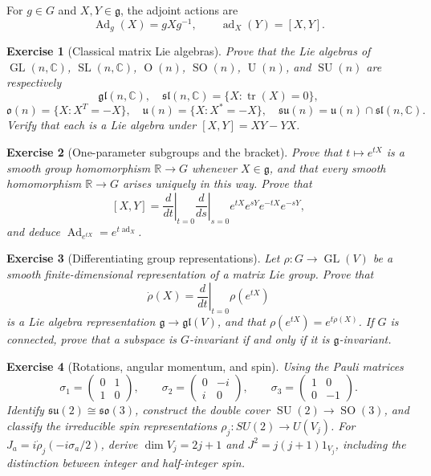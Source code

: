 \documentclass{article}
\newtheorem{exercise}{Exercise}
\newcommand{\trace}{\operatorname{tr}}
\begin{document}
For $g\in G$ and $X,Y\in\mathfrak g$, the adjoint actions are
\[
\operatorname{Ad}_g(X)=gXg^{-1},
\qquad
\operatorname{ad}_X(Y)=[X,Y].
\]

\begin{exercise}[Classical matrix Lie algebras]\leavevmode\par
\textit{Prove that the Lie algebras of $\operatorname{GL}(n,\mathbb C)$, $\operatorname{SL}(n,\mathbb C)$, $\operatorname{O}(n)$, $\operatorname{SO}(n)$, $\operatorname{U}(n)$, and $\operatorname{SU}(n)$ are respectively}
\[
\mathfrak{gl}(n,\mathbb C),
\quad
\mathfrak{sl}(n,\mathbb C)=\{X:\trace(X)=0\},
\]
\[
\mathfrak{o}(n)=\{X:X^T=-X\},
\quad
\mathfrak{u}(n)=\{X:X^*=-X\},
\quad
\mathfrak{su}(n)=\mathfrak{u}(n)\cap\mathfrak{sl}(n,\mathbb C).
\]
\textit{Verify that each is a Lie algebra under $[X,Y]=XY-YX$.}
\end{exercise}

\begin{exercise}[One-parameter subgroups and the bracket]\leavevmode\par
\textit{Prove that $t\mapsto e^{tX}$ is a smooth group homomorphism $\mathbb R\to G$ whenever $X\in\mathfrak g$, and that every smooth homomorphism $\mathbb R\to G$ arises uniquely in this way. Prove that}
\[
[X,Y]
=\left.\frac{d}{dt}\right|_{t=0}
\left.\frac{d}{ds}\right|_{s=0}
e^{tX}e^{sY}e^{-tX}e^{-sY},
\]
\textit{and deduce $\operatorname{Ad}_{e^{tX}}=e^{t\operatorname{ad}_X}$.}
\end{exercise}

\begin{exercise}[Differentiating group representations]\leavevmode\par
\textit{Let $\rho:G\to\operatorname{GL}(V)$ be a smooth finite-dimensional representation of a matrix Lie group. Prove that}
\[
\dot\rho(X)
=\left.\frac{d}{dt}\right|_{t=0}\rho(e^{tX})
\]
\textit{is a Lie algebra representation $\mathfrak g\to\mathfrak{gl}(V)$, and that $\rho(e^{tX})=e^{t\dot\rho(X)}$. If $G$ is connected, prove that a subspace is $G$-invariant if and only if it is $\mathfrak g$-invariant.}
\end{exercise}

\begin{exercise}[Rotations, angular momentum, and spin]\leavevmode\par
\textit{Using the Pauli matrices}
\[
\sigma_1=\begin{pmatrix}0&1\\1&0\end{pmatrix},
\qquad
\sigma_2=\begin{pmatrix}0&-i\\i&0\end{pmatrix},
\qquad
\sigma_3=\begin{pmatrix}1&0\\0&-1\end{pmatrix}.
\]
\textit{Identify $\mathfrak{su}(2)\cong\mathfrak{so}(3)$, construct the
double cover $\operatorname{SU}(2)\to\operatorname{SO}(3)$, and classify the
irreducible spin representations $\rho_j:SU(2)\to U(V_j)$. For
$J_a=i\dot\rho_j(-i\sigma_a/2)$, derive
$\dim V_j=2j+1$ and $J^2=j(j+1)1_{V_j}$, including the distinction between
integer and half-integer spin.}
\end{exercise}
\end{document}
